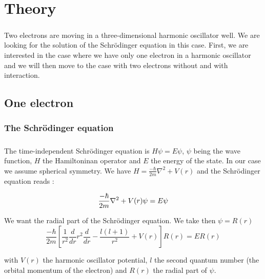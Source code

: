 \documentclass[a4paper, twoside, 11pt]{report}
\theoremstyle{theorem}
\theoremstyle{remark}
\theoremstyle{exemple}
\begin{document}
\chapter{Theory}
    
        \paragraph{} Two electrons are moving in a three-dimensional harmonic oscillator well. We are looking for the solution of the Schrödinger equation in this case. First, we are interested in the case where we have only one electron in a harmonic oscillator and we will then move to the case with two electrons without and with interaction.
        
    \section{One electron}
    
        \subsection{The Schrödinger equation}
           
            \paragraph{}The time-independent Schrödinger equation is $H \psi = E \psi$, $\psi$ being the wave function, $H$ the Hamiltoninan operator and $E$ the energy of the state. In our case we assume spherical symmetry. We have $H = \frac{-\hbar}{2m} \nabla^2 + V(r)$ and the Schrödinger equation reads : 
        
        	\begin{equation*}
           		\frac{-\hbar}{2m} \nabla^2 + V(r) \psi = E \psi \\
       		\end{equation*}
   
   			We want the radial part of the Schrödinger equation. We take then $\psi = R(r)$
       		\begin{equation*}
           		\frac{-\hbar}{2m} \left[\frac{1}{r^2} \frac{d}{d r} r^2 \frac{d}{dr} - \frac{l(l+1)}{r^2} + V(r) \right] R(r) = E R(r)
       		\end{equation*}
		
   			with $V(r)$ the harmonic oscillator potential, $l$ the second quantum number (the orbital momentum of the electron) and $R(r)$ the radial part of $\psi$. 
    
\end{document}
